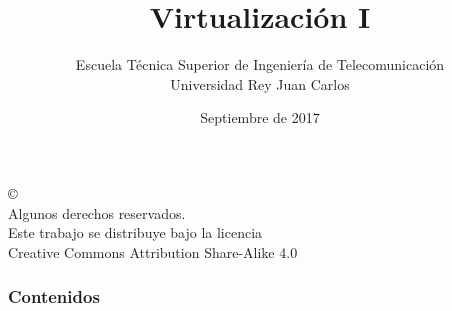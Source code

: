 \documentclass[ucs]{beamer}
\begin{document}
\title[Virtualización I]{Virtualización I}
\author[GSyC]{Escuela Técnica Superior de Ingeniería de Telecomunicación\\
Universidad Rey Juan Carlos}
\date[2017]{Septiembre de 2017}



\begin{frame}
  \titlepage
\end{frame}



\begin{frame}[b]
\begin{flushright}
{\tiny
\copyright \insertshortdate~\insertshortauthor \\
  Algunos derechos reservados. \\
  Este trabajo se distribuye bajo la licencia \\
  Creative Commons Attribution Share-Alike 4.0\\
}
\end{flushright}  
\end{frame}



\begin{frame}
  \frametitle{Contenidos}

  \tableofcontents

\end{frame}
\end{document}
